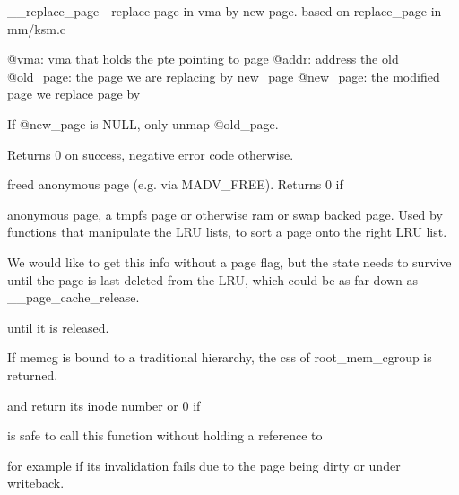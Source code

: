 \+\_\+\+\_\+replace\+\_\+page -\/ replace page in vma by new page. based on replace\+\_\+page in mm/ksm.\+c

@vma\+: vma that holds the pte pointing to page @addr\+: address the old @old\+\_\+page\+: the page we are replacing by new\+\_\+page @new\+\_\+page\+: the modified page we replace page by

If @new\+\_\+page is N\+U\+LL, only unmap @old\+\_\+page.

Returns 0 on success, negative error code otherwise.

freed anonymous page (e.\+g. via M\+A\+D\+V\+\_\+\+F\+R\+EE). Returns 0 if

anonymous page, a tmpfs page or otherwise ram or swap backed page. Used by functions that manipulate the L\+RU lists, to sort a page onto the right L\+RU list.

We would like to get this info without a page flag, but the state needs to survive until the page is last deleted from the L\+RU, which could be as far down as \+\_\+\+\_\+page\+\_\+cache\+\_\+release.

until it is released.

If memcg is bound to a traditional hierarchy, the css of root\+\_\+mem\+\_\+cgroup is returned.

and return its inode number or 0 if

is safe to call this function without holding a reference to

for example if its invalidation fails due to the page being dirty or under writeback. 